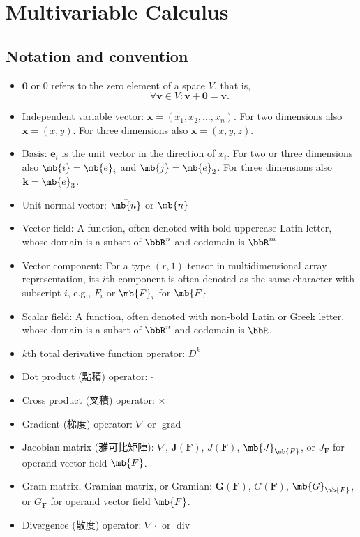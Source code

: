 \section{Multivariable Calculus}
\subsection{Notation and convention}
\begin{itemize}
\item $\mathbf{0}$ or $0$ refers to the zero element of a space $V$, that is, 
\[\forall\mathbf{v}\in V\colon\mathbf{v}+\mathbf{0}=\mathbf{v}.\]
\item Independent variable vector: $\mathbf{x}=(x_1,x_2,\dots,x_n)$. For two dimensions also $\mathbf{x}=(x,y)$. For three dimensions also $\mathbf{x}=(x,y,z)$.
\item Basis: $\mathbf{e}_i$ is the unit vector in the direction of $x_i$. For two or three dimensions also $\mb{i}=\mb{e}_i$ and $\mb{j}=\mb{e}_2$. For three dimensions also $\mathbf{k}=\mb{e}_3$.
\item Unit normal vector: $\hat{\mb{n}}$ or $\mb{n}$
\item Vector field: A function, often denoted with bold uppercase Latin letter, whose domain is a subset of $\bbR^n$ and codomain is $\bbR^m$.
\item Vector component: For a type $(r,1)$ tensor in multidimensional array representation, its $i$th component is often denoted as the same character with subscript $i$, e.g., $F_i$ or $\mb{F}_i$ for $\mb{F}$.
\item Scalar field: A function, often denoted with non-bold Latin or Greek letter, whose domain is a subset of $\bbR^n$ and codomain is $\bbR$.
\item $k$th total derivative function operator: $D^k$
\item Dot product (點積) operator: $\cdot$
\item Cross product (叉積) operator: $\times$
\item Gradient (梯度) operator: $\nabla$ or $\operatorname{grad}$
\item Jacobian matrix (雅可比矩陣): $\nabla$, $\mathbf{J}(\mathbf{F})$, $J(\mathbf{F})$, $\mb{J}_{\mb{F}}$, or $J_{\mathbf{F}}$ for operand vector field $\mb{F}$.
\item Gram matrix, Gramian matrix, or Gramian: $\mathbf{G}(\mathbf{F})$, $G(\mathbf{F})$, $\mb{G}_{\mb{F}}$, or $G_{\mathbf{F}}$ for operand vector field $\mb{F}$.
\item Divergence (散度) operator: $\nabla \cdot$ or $\operatorname{div}$

\end{itemize}
